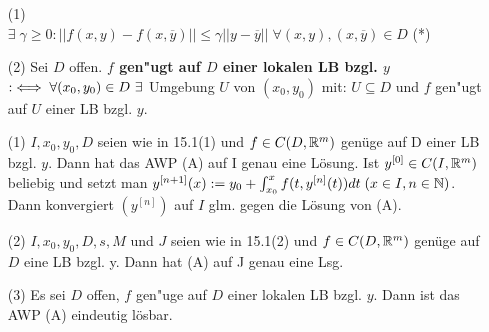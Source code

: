 \documentclass{article}
\begin{document}
\begin{definition}
\begin{itemize}
\item[(1)]
 \equizu \\
$\exists \; \gamma \geq 0 : ||f(x,y) - f(x,\overline{y})|| \leq \gamma ||y - \overline{y}|| \; \forall (x,y), (x,\overline{y}) \in D$ \; (*)
\item[(2)]
Sei $D$ offen. \textbf{$f$ gen"ugt auf $D$ einer lokalen LB bzgl. $y$} $:\equizu \forall (x_0,y_0)\in D\ \exists $ Umgebung $U$ von $(x_0,y_0)$ mit: $U\subseteq D$ und $f$ gen"ugt auf $U$ einer LB bzgl. $y$.
\end{itemize}
\end{definition}

\begin{satz} 
\begin{itemize}
\item[(1)]
$I, x_0, y_0, D$ seien wie in 15.1(1) und $f \in C(D,\mathbb{R}^m)$ genüge auf D einer LB bzgl. $y$.
Dann hat das AWP (A) auf I genau eine Lösung. Ist  $y^{[0]} \in C(I,\mathbb{R}^m)$ beliebig und setzt man $y^{[n+1]}(x) := y_0  + \int_{x_0}^{x} f(t,y^{[n]}(t)) dt \; (x \in I, n \in \mathbb{N})$. Dann konvergiert $(y^{[n]})$ auf $I$ glm. gegen die Lösung von (A).

\item[(2)] 
$I, x_0, y_0, D, s, M$ und $J$ seien wie in 15.1(2) und $f \in C(D,\mathbb{R}^m)$ genüge auf $D$ eine LB bzgl. y. Dann hat (A) auf J genau eine Lsg.

\item[(3)] 
Es sei $D$ offen, $f$ gen"uge auf $D$ einer lokalen LB bzgl. $y$. Dann ist das AWP (A) eindeutig lösbar.
\end{itemize}

\end{satz}
\end{document}
